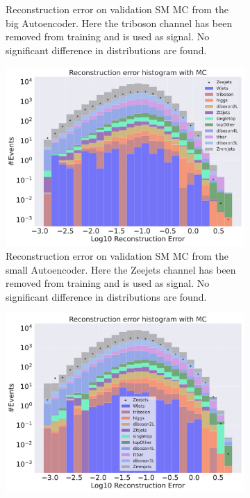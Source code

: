 \begin{figure}[h!]
\begin{subfigure}{.45\textwidth}
        \caption{Reconstruction error on validation SM MC from the big Autoencoder. Here the triboson channel has been removed from training and 
        is used as signal. No significant difference in distributions are found. }
        \label{fig:vae_big_triboson}
    \end{subfigure}
    \hfill  
    \caption{ }
    \label{fig:vae_big_channel4}
\end{figure}

\begin{figure}[h!]
    \centering
    \begin{subfigure}{.45\textwidth}
        \includegraphics[width=\textwidth]{Figures/VAE_testing/small/b_data_recon_big_rm3_feats_sig_Zeejets.pdf}
        \caption{Reconstruction error on validation SM MC from the small Autoencoder. Here the Zeejets channel has been removed from training and 
        is used as signal. No significant difference in distributions are found.}
        \label{fig:vae_small_Zeejets}
    \end{subfigure}
    \hfill 
    \begin{subfigure}{.45\textwidth}
        \includegraphics[width=\textwidth]{Figures/VAE_testing/big/b_data_recon_big_rm3_feats_sig_Zeejets.pdf}

\end{subfigure}
\end{figure}
